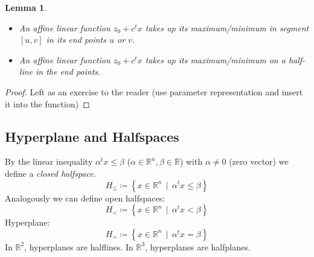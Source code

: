\documentclass[a4paper]{article}
\newcounter{lecref}[subsection]
\numberwithin{lecref}{subsection}
\newtheorem{lemma}[lecref]{Lemma}
\newcommand{\SetDef}[2]{\left\{#1\,\mid\,#2\right\}}
\begin{document}
\begin{lemma}
	\label{lemma:1.1}
	\begin{itemize}
		\item An affine linear function $z_0 + c^t x$ takes up its maximum/minimum in segment $[u, v]$ in its end points $u$ or $v$.
		\item An affine linear function $z_0 + c^t x$ takes up its maximum/minimum on a half-line in the end points.
	\end{itemize}
\end{lemma}
\begin{proof}
	Left as an exercise to the reader (use parameter representation and insert it into the function)
\end{proof}

\subsection{Hyperplane and Halfspaces}

By the linear inequality $\alpha^t x \leq \beta$ ($\alpha \in \mathbb R^n, \beta \in \mathbb R$) with $\alpha \neq 0$ (zero vector) we define a \emph{closed halfspace}.
\[ H_{\leq} \coloneqq \SetDef{x \in \mathbb R^n}{\alpha^t x \leq \beta} \]
Analogously we can define open halfspaces:
\[ H_{<} \coloneqq \SetDef{x \in \mathbb R^n}{\alpha^t x < \beta} \]
Hyperplane:
\[ H_{=} \coloneqq \SetDef{x \in \mathbb R^n}{\alpha^t x = \beta} \]
In $\mathbb R^2$, hyperplanes are halflines.
In $\mathbb R^3$, hyperplanes are halfplanes.
\end{document}

